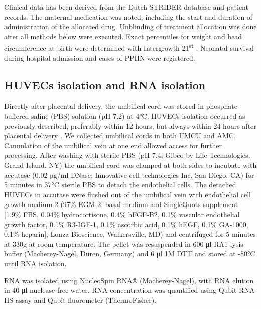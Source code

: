 \documentclass[authordate, empirical]{jote-new-article}
\begin{document}
Clinical data has been derived from the Dutch STRIDER database and patient records. The maternal medication was noted, including the start and duration of administration of the allocated drug. Unblinding of treatment allocation was done after all methods below were executed. Exact percentiles for weight and head circumference at birth were determined with Intergrowth-21\textsuperscript{st }\parencites{Anderson2016}. Neonatal survival during hospital admission and cases of PPHN were registered.







\subsection{HUVECs isolation and RNA isolation }



Directly after placental delivery, the umbilical cord was stored in phosphate-buffered saline (PBS) solution (pH 7.2) at 4°C. HUVECs isolation occurred as previously described, preferably within 12 hours, but always within 24 hours after placental delivery \parencites{Hartman2020}. We collected umbilical cords in both UMCU and AMC. Cannulation of the umbilical vein at one end allowed access for further processing. After washing with sterile PBS (pH 7.4; Gibco by Life Technologies, Grand Island, NY) the umbilical cord was clamped at both sides to incubate with accutase (0.02 µg/ml DNase; Innovative cell technologies Inc, San Diego, CA) for 5 minutes in 37°C sterile PBS to detach the endothelial cells. The detached HUVECs in accutase were flushed out of the umbilical vein with endothelial cell growth medium-2 (97\% EGM-2; basal medium and SingleQuots supplement [1.9\% FBS, 0.04\% hydrocortisone, 0.4\% hFGF-B2, 0.1\% vascular endothelial growth factor, 0.1\% R3-IGF-1, 0.1\% ascorbic acid, 0.1\% hEGF, 0.1\% GA-1000, 0.1\% heparin], Lonza Bioscience, Walkersville, MD) and centrifuged for 5 minutes at 330g at room temperature. The pellet was resuspended in 600 μl RA1 lysis buffer (Macherey-Nagel, Düren, Germany) and 6 μl 1M DTT and stored at -80°C until RNA isolation.



RNA was isolated using NucleoSpin RNA® (Macherey-Nagel), with RNA elution in 40 μl nuclease-free water. RNA concentration was quantified using Qubit RNA HS assay and Qubit fluorometer (ThermoFisher).
\end{document}
